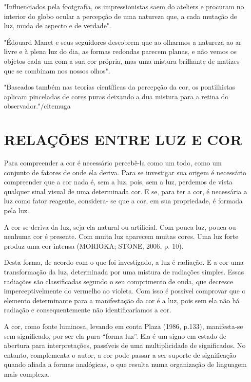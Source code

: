 "Influenciados pela footgrafia, os impressionistas saem do ateliers e procuram no interior do globo ocular a percepção de uma natureza que, a cada mutação de luz, muda de aspecto e de verdade".


"Édouard Manet e seus seguidores descobrem que ao olharmos a natureza ao ar livre e à plena luz do dia, as formas redondas parecem planas, e não vemos os objetos cada um com a sua cor própria, mas uma mistura brilhante de matizes que se combinam nos nossos olhos". 

"Baseados também nas teorias científicas da percepção da cor, os pontilhistas aplicam pinceladas de cores puras deixando a dua mistura para a retina do observador."/cite{muga}

   


\section{RELAÇÕES ENTRE LUZ E COR}

Para compreender a cor é necessário percebê-la como um todo, como um conjunto de fatores de onde ela deriva. Para se investigar sua origem é necessário compreender que a cor nada é, sem a luz, pois, sem a luz, perdemos de vista qualquer sinal visual de uma determinada cor. E se, para ter a cor, é necessária a luz como fator reagente, considera- se que a cor, em sua propriedade, é formada pela luz. \cite[p. 55]{henno}


A cor se deriva da luz, seja ela natural ou artificial. Com pouca luz, pouca ou nenhuma cor é presente. Com muita luz aparecem muitas cores. Uma luz forte produz uma cor intensa (MORIOKA; STONE, 2006, p. 10). \cite[p.56]{henno}

Desta forma, de acordo com o que foi investigado, a luz é radiação. E a cor uma transformação da luz, determinada por uma mistura de radiações simples. Essas radiações são classificadas segundo o seu comprimento de onda, que decresce imperceptivelmente do vermelho ao violeta. Com isso é possível comprovar que o elemento determinante para a manifestação da cor é a luz, pois sem ela não há radiação e consequentemente não identificaríamos a cor. \cite[p.56]{henno}

A cor, como fonte luminosa, levando em conta Plaza (1986, p.133), manifesta-se sem significado, por ser ela pura “forma-luz”. Ela é um signo em estado de abertura para interpretações, passíveis de uma multiplicidade de significados. No entanto, complementa o autor, a cor pode passar a ser suporte de significação quando aliada a formas analógicas, o que resulta numa organização de linguagem mais complexa. \cite[p.60]{henno}


